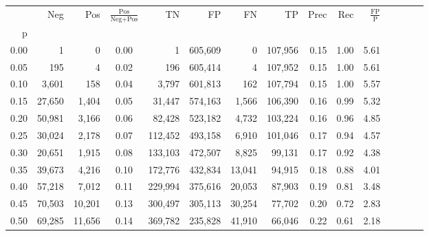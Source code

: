 \begin{tabular}{rrrcrrrrrrrrrrr}
\toprule
{} &     Neg &     Pos & $\frac{\text{Pos}}{\text{Neg}+\text{Pos}}$ &       TN &       FP &       FN &       TP &  Prec &   Rec & $\frac{\text{FP}}{\text{P}}$ \\
p    &         &         &                                            &          &          &          &          &       &       &                              \\
\midrule
0.00 &       1 &       0 &                                       0.00 &        1 &  605,609 &        0 &  107,956 &  0.15 &  1.00 &                         5.61 \\
0.05 &     195 &       4 &                                       0.02 &      196 &  605,414 &        4 &  107,952 &  0.15 &  1.00 &                         5.61 \\
0.10 &   3,601 &     158 &                                       0.04 &    3,797 &  601,813 &      162 &  107,794 &  0.15 &  1.00 &                         5.57 \\
0.15 &  27,650 &   1,404 &                                       0.05 &   31,447 &  574,163 &    1,566 &  106,390 &  0.16 &  0.99 &                         5.32 \\
0.20 &  50,981 &   3,166 &                                       0.06 &   82,428 &  523,182 &    4,732 &  103,224 &  0.16 &  0.96 &                         4.85 \\
0.25 &  30,024 &   2,178 &                                       0.07 &  112,452 &  493,158 &    6,910 &  101,046 &  0.17 &  0.94 &                         4.57 \\
0.30 &  20,651 &   1,915 &                                       0.08 &  133,103 &  472,507 &    8,825 &   99,131 &  0.17 &  0.92 &                         4.38 \\
0.35 &  39,673 &   4,216 &                                       0.10 &  172,776 &  432,834 &   13,041 &   94,915 &  0.18 &  0.88 &                         4.01 \\
0.40 &  57,218 &   7,012 &                                       0.11 &  229,994 &  375,616 &   20,053 &   87,903 &  0.19 &  0.81 &                         3.48 \\
0.45 &  70,503 &  10,201 &                                       0.13 &  300,497 &  305,113 &   30,254 &   77,702 &  0.20 &  0.72 &                         2.83 \\
0.50 &  69,285 &  11,656 &                                       0.14 &  369,782 &  235,828 &   41,910 &   66,046 &  0.22 &  0.61 &                         2.18 \\

\end{tabular}
